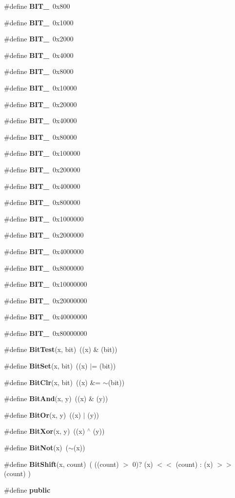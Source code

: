\begin{CompactItemize}
\item 
\#define {\bf BIT\_}\ 0x800
\item 
\#define {\bf BIT\_}\ 0x1000
\item 
\#define {\bf BIT\_}\ 0x2000
\item 
\#define {\bf BIT\_}\ 0x4000
\item 
\#define {\bf BIT\_}\ 0x8000
\item 
\#define {\bf BIT\_}\ 0x10000
\item 
\#define {\bf BIT\_}\ 0x20000
\item 
\#define {\bf BIT\_}\ 0x40000
\item 
\#define {\bf BIT\_}\ 0x80000
\item 
\#define {\bf BIT\_}\ 0x100000
\item 
\#define {\bf BIT\_}\ 0x200000
\item 
\#define {\bf BIT\_}\ 0x400000
\item 
\#define {\bf BIT\_}\ 0x800000
\item 
\#define {\bf BIT\_}\ 0x1000000
\item 
\#define {\bf BIT\_}\ 0x2000000
\item 
\#define {\bf BIT\_}\ 0x4000000
\item 
\#define {\bf BIT\_}\ 0x8000000
\item 
\#define {\bf BIT\_}\ 0x10000000
\item 
\#define {\bf BIT\_}\ 0x20000000
\item 
\#define {\bf BIT\_}\ 0x40000000
\item 
\#define {\bf BIT\_}\ 0x80000000
\item 
\#define {\bf Bit\-Test}(x, bit)\ ((x) \& (bit))
\item 
\#define {\bf Bit\-Set}(x, bit)\ ((x) $|$= (bit))
\item 
\#define {\bf Bit\-Clr}(x, bit)\ ((x) \&= $\sim$(bit))
\item 
\#define {\bf Bit\-And}(x, y)\ ((x) \& (y))
\item 
\#define {\bf Bit\-Or}(x, y)\ ((x) $|$ (y))
\item 
\#define {\bf Bit\-Xor}(x, y)\ ((x) $^\wedge$ (y))
\item 
\#define {\bf Bit\-Not}(x)\ ($\sim$(x))
\item 
\#define {\bf Bit\-Shift}(x, count)\ ( ((count) $>$ 0)? (x) $<$$<$ (count) : (x) $>$$>$ (count) )
\item 
\#define {\bf public}
\item 

\end{CompactItemize}

